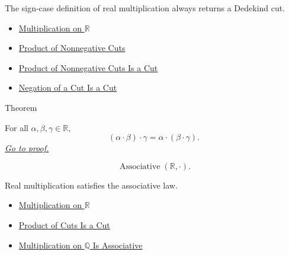 \begin{remark*}[Interpretation]
The sign-case definition of real multiplication always returns a Dedekind cut.
\end{remark*}

\begin{dependencies}
\begin{itemize}
  \item \hyperref[def:multiplication-on-r]{Multiplication on $\mathbb{R}$}
  \item \hyperref[def:product-nonnegative-on-r]{Product of Nonnegative Cuts}
  \item \hyperref[lem:product-nonnegative-is-a-cut]{Product of Nonnegative Cuts Is a Cut}
  \item \hyperref[lem:negation-of-cut-is-a-cut]{Negation of a Cut Is a Cut}
\end{itemize}
\end{dependencies}

\begin{theorembox}{Theorem}
\begin{theorem}
\label{thm:multiplication-on-r-associative}
For all $\alpha,\beta,\gamma\in\mathbb{R}$,
\[
(\alpha\cdot\beta)\cdot\gamma=\alpha\cdot(\beta\cdot\gamma).
\]
\hyperref[prf:multiplication-on-r-associative]{\textit{Go to proof.}}
\end{theorem}
\end{theorembox}

\begin{remark*}
\[
\operatorname{Associative}(\mathbb{R},\cdot).
\]
\end{remark*}

\begin{remark*}[Interpretation]
Real multiplication satisfies the associative law.
\end{remark*}

\begin{dependencies}
\begin{itemize}
  \item \hyperref[def:multiplication-on-r]{Multiplication on $\mathbb{R}$}
  \item \hyperref[lem:product-of-cuts-is-a-cut]{Product of Cuts Is a Cut}
  \item \hyperref[thm:multiplication-on-q-associative]{Multiplication on $\mathbb{Q}$ Is Associative}
\end{itemize}
\end{dependencies}

